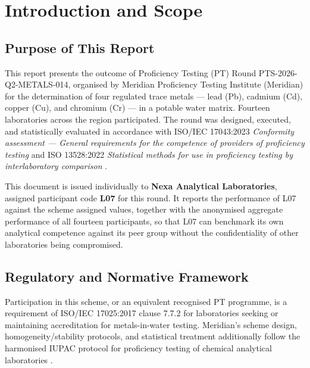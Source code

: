 \section{Introduction and Scope}

\subsection{Purpose of This Report}
This report presents the outcome of Proficiency Testing (PT) Round PTS-2026-Q2-METALS-014,
organised by Meridian Proficiency Testing Institute (Meridian) for the determination of four
regulated trace metals --- lead (Pb), cadmium (Cd), copper (Cu), and chromium (Cr) --- in a
potable water matrix. Fourteen laboratories across the region participated. The round was
designed, executed, and statistically evaluated in accordance with ISO/IEC 17043:2023
\textit{Conformity assessment --- General requirements for the competence of providers of
proficiency testing} \cite{iso17043} and ISO 13528:2022 \textit{Statistical methods for use in
proficiency testing by interlaboratory comparison} \cite{iso13528}.

This document is issued individually to \textbf{Nexa Analytical Laboratories}, assigned
participant code \textbf{L07} for this round. It reports the performance of L07 against the
scheme assigned values, together with the anonymised aggregate performance of all fourteen
participants, so that L07 can benchmark its own analytical competence against its peer group
without the confidentiality of other laboratories being compromised.

\subsection{Regulatory and Normative Framework}
Participation in this scheme, or an equivalent recognised PT programme, is a requirement of
ISO/IEC 17025:2017 clause 7.7.2 for laboratories seeking or maintaining accreditation for
metals-in-water testing. Meridian's scheme design, homogeneity/stability protocols, and
statistical treatment additionally follow the harmonised IUPAC protocol for proficiency testing
of chemical analytical laboratories \cite{thompson2006harmonized}.

